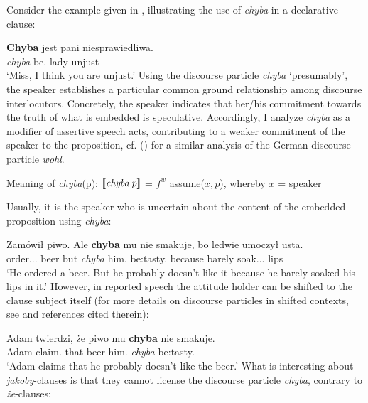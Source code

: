 \documentclass[output=paper
,modfonts
,nonflat]{langsci/langscibook}
\begin{document}
\noindent Consider the example given in , illustrating the use of \emph{chyba} in a declarative clause:

\ea \gll \textbf{Chyba} jest pani niesprawiedliwa. \label{chyba} \\
		\emph{chyba} be.{\thirdperson}{\sg} lady unjust \\
\glt	`Miss, I think you are unjust.' 
\z
Using the discourse particle \emph{chyba} `presumably', the speaker establishes a particular common ground relationship among discourse interlocutors. Concretely, the speaker indicates that her\slash his commitment towards the truth of what is embedded is speculative. Accordingly, I analyze \emph{chyba} as a modifier of assertive speech acts, contributing to a weaker commitment of the speaker to the proposition, cf. \citeauthor{Zimmermann2004} (\citeyear{Zimmermann2004, Zimmermann2011a})  for a similar analysis of the German discourse particle \emph{wohl}.

\ea	Meaning of \emph{chyba}(p): \newline
	\([\![\emph{chyba} \; p]\!]\) = $f^{w}$ assume(\( x,p \)), whereby \(x\) = speaker
\z
       
\noindent Usually, it is the speaker who is uncertain about the content of the embedded proposition using \emph{chyba}: 

\ea \gll Zamówił piwo. Ale \textbf{chyba} mu nie smakuje, bo ledwie umoczył usta. \\
		order.{\lptcp}.{\sg}.{\masc} beer but \emph{chyba} him.{\dat} {\negation} {be:tasty}.{\thirdperson}{\sg} because barely soak.{\lptcp}.{\sg}.{\masc} lips \\  
\glt	`He ordered a beer. But he probably doesn't like it because he barely soaked his lips in it.' 
\z
However, in reported speech the attitude holder can be shifted to the clause subject itself (for more details on discourse particles in shifted contexts, see \textcite{Doring2013} and references cited therein):

\ea \gll Adam twierdzi, że piwo mu \textbf{chyba} nie smakuje. \\
		Adam claim.{\thirdperson}{\sg} that beer him.{\dat} \emph{chyba} {\negation} {be:tasty}.{\thirdperson}{\sg} \\
\glt	`Adam claims that he probably doesn't like the beer.' 
\z
What is interesting about \emph{jakoby}-clauses is that they cannot license the discourse particle \emph{chyba}, contrary to \emph{że}-clauses: 
\end{document}

